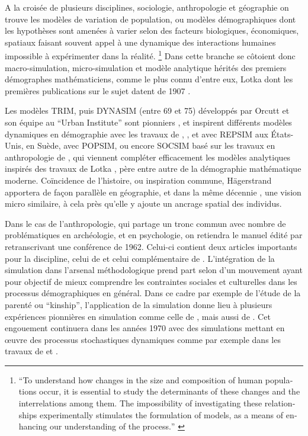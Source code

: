 A la croisée de plusieurs disciplines, sociologie, anthropologie et géographie on trouve les modèles de variation de population, ou modèles démographiques dont les hypothèses sont amenées à varier selon des facteurs biologiques, économiques, spatiaux faisant souvent appel à une dynamique des interactions humaines impossible à expérimenter dans la réalité. \footnote {\foreignquote{english}{To understand how changes in the size and composition of human populations occur, it is essential to study the determinants of these changes and the interrelations among them. The impossibility of investigating these relationships experimentally stimulates the formulation of models, as a means of enhancing our understanding of the process.} \autocite{Sheps1971}} Dans cette branche se côtoient donc macro-simulation, micro-simulation et modèle analytique hérités des premiers démographes mathématiciens, comme le plus connu d'entre eux, Lotka dont les premières publications sur le sujet datent de 1907 \autocite[355]{Veron2009}.

Les modèles TRIM, puis DYNASIM (entre 69 et 75) développés par Orcutt et son équipe au \foreignquote{english}{Urban Institute} sont pionniers \autocite{Orcutt1957, Orcutt1960, Orcutt1976}, et inspirent différents modèles dynamiques en démographie avec les travaux de \textcite{Perrin1964}, \textcite{Sheps1971}, et \textcite{Ridley1966} avec REPSIM aux États-Unis,  \textcite{Hyrenius1964} en Suède, \textcite{Horvitz1971} avec POPSIM, ou encore SOCSIM basé sur les travaux en anthropologie de \textcite{Gilbert1966}, qui viennent compléter efficacement les modèles analytiques inspirés des travaux de Lotka \autocite{Sheps1971}, père entre autre de la démographie mathématique moderne. Coïncidence de l'histoire, ou inspiration commune, Hägerstrand apportera de façon parallèle en géographie, et dans la même décennie \autocite{Hagerstrand1952, Hagerstrand1967}, une vision micro similaire, à cela près qu'elle y ajoute un ancrage spatial des individus.

Dans le cas de l'anthropologie, qui partage un tronc commun avec nombre de problématiques en archéologie, et en psychologie, on retiendra le manuel édité par \textcite{Hymes1965} retranscrivant une conférence de 1962. Celui-ci contient deux articles importants pour la discipline, celui de \textcite{Gullahorn1965} et celui complémentaire de \textcite{Hays1965}. L'intégration de la simulation dans l'arsenal méthodologique prend part selon \textcite[274]{Bentley2009} d'un mouvement ayant pour objectif de mieux comprendre les contraintes sociales et culturelles dans les processus démographiques en général. Dans ce cadre par exemple de l'étude de la parenté ou \foreignquote{english}{kinship}, l'application de la simulation donne lieu à plusieurs expériences pionnières \autocite{Dyke1981} en simulation comme celle de \textcite{Kunstadter1963}, mais aussi de \textcite{Gilbert1966}. Cet engouement continuera dans les années 1970 \autocite{Read1999} avec des simulations mettant en œuvre des processus stochastiques dynamiques comme par exemple dans les travaux de \textcite{Howell1978} et \textcite{Thomas1973}.

